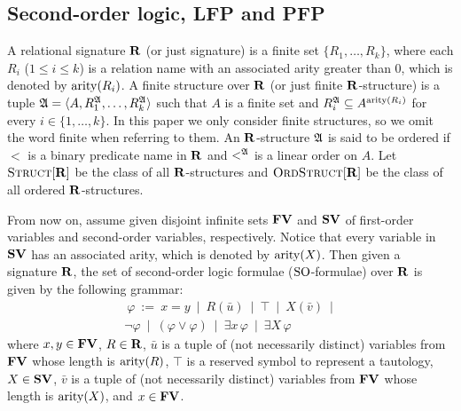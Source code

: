 

\subsection{Second-order logic, LFP and PFP}
A relational signature $\mathbf{R}$ (or just signature) is a finite set $\{R_1, \ldots, R_k\}$, where each $R_i$ ($1 \leq i \leq k$) is a relation name with an associated arity greater than 0, which is denoted by ${\rm arity}(R_i)$. A finite structure over $\mathbf{R}$ (or just finite $\mathbf{R}$-structure) is a tuple $\mathfrak{A} = \langle A, R_1^{\mathfrak{A}}, \ldots, R_k^{\mathfrak{A}} \rangle$ such that $A$ is a finite set and $R_i^{\mathfrak{A}} \subseteq A^{{\rm arity}(R_i)}$ for every $i \in \{1, \ldots, k\}$. In this paper we only consider finite structures, so we omit the word finite when referring to them. An $\mathbf{R}$-structure $\mathfrak{A}$ is said to be ordered if $<$ is a binary predicate name in $\mathbf{R}$ and $<^{\mathfrak{A}}$ is a linear order on $A$. Let $\text{\sc Struct}[\mathbf{R}]$ be the class of all $\mathbf{R}$-structures and $\text{\sc OrdStruct}[\mathbf{R}]$ be the class of all ordered $\mathbf{R}$-structures. 

From now on, assume given disjoint infinite sets $\mathbf{FV}$ and $\mathbf{SV}$ of first-order variables and second-order variables, respectively. Notice that every variable in $\mathbf{SV}$ has an associated arity, which is denoted by ${\rm arity}(X)$. Then given a  signature $\mathbf{R}$, the set of second-order logic formulae (${\rm SO}$-formulae) over $\mathbf{R}$ is given by the following grammar:
\begin{multline*}\ 
	\varphi \ := \ x = y \ \mid \ R(\bar u) \ \mid \ \top  \ \mid\  
	X(\bar v)  \ \mid\\ 
	\neg \varphi \ \mid\ 
	(\varphi \vee \varphi) \ \mid\ 
	\exists x \, \varphi \ \mid\ 
	\exists X \, \varphi
\end{multline*}
where $x,y \in \mathbf{FV}$, $R \in \mathbf{R}$, $\bar u$ is a tuple of (not necessarily distinct) variables from $\mathbf{FV}$ whose length is ${\rm arity}(R)$, $\top$ is a reserved symbol to represent a tautology, $X \in \mathbf{SV}$, $\bar v$ is a tuple of (not necessarily distinct) variables from $\mathbf{FV}$ whose length is ${\rm arity}(X)$, and $x \in \mathbf{FV}$. 



